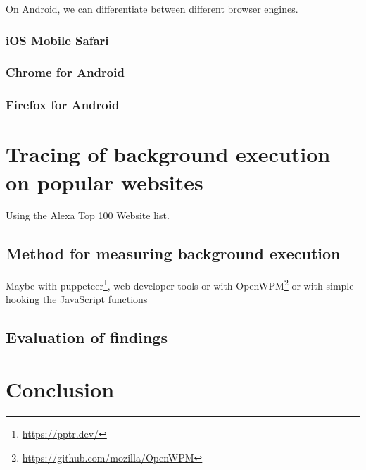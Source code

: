 \documentclass[article,type=bsc,colorback,accentcolor=tud9c]{tudthesis}
\begin{document}
  On Android, we can differentiate between different browser engines.

  \subsubsection{iOS Mobile Safari}

  \subsubsection{Chrome for Android}

  \subsubsection{Firefox for Android}

  \newpage
  \section{Tracing of background execution on popular websites}

  Using the Alexa Top 100 Website list.
  
  \subsection{Method for measuring background execution}

  Maybe with puppeteer\footnote{\url{https://pptr.dev/}}, web developer tools or with OpenWPM\footnote{\url{https://github.com/mozilla/OpenWPM}} or with simple hooking the JavaScript functions
  
  \subsection{Evaluation of findings}

  
  \newpage
  \section{Conclusion}

  

  

   
\end{document}
